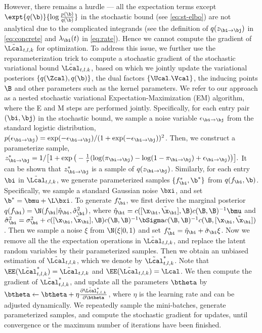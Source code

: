  However, there remains a hurdle ---  all the expectation terms except $\expt{q(\b)}{\log\frac{p(\b)}{q(\b)}}$ in the stochastic bound (see \eqref{eq:st-elbo}) are not analytical due to the complicated integrands (see the definition of $q(z_{\bi \rightarrow \bj})$ in \eqref{eq:concrete} and $\lambda_\bi(t)$ in \eqref{eq:rate}).  Hence we cannot  compute the gradient of $\tilde{\Lcal}_{t,l,k}$ for optimization. To address this issue, we further use the reparameterization trick to compute a stochastic gradient of the stochastic variational bound  $\tilde{\Lcal}_{t,l.k}$, based on which we jointly update the variational posteriors $\{q(\Zcal), q(\b)\}$, the dual factors $\{\Ucal. \Vcal\}$, the inducing points $\B$ and other parameters such as the kernel parameters. We refer to our approach as a nested stochastic variational Expectation-Maximization (EM) algorithm, where the E and M steps are performed jointly. Specifically, for each entry pair $(\bi, \bj)$ in the stochastic bound, we sample a noise variable $\epsilon_{\bi\rightarrow \bj}$ from the standard logistic distribution, $p(\epsilon_{\bi\rightarrow \bj} ) = {\exp(-\epsilon_{\bi\rightarrow \bj})}/{(1 + \exp(-\epsilon_{\bi\rightarrow \bj}))^2}$. Then, we construct a parameterize sample, $z^*_{\bi\rightarrow \bj} = {1}/\big[{1 + \exp\big(-\frac{1}{\tau}(\log(\pi_{\bi \rightarrow \bj}) - \log(1 - \pi_{\bi \rightarrow \bj}) + \epsilon_{\bi\rightarrow \bj})\big)}\big].$
 It can be shown that $z^*_{\bi \rightarrow \bj}$ is a sample of $q(z_{\bi \rightarrow \bj})$. Similarly, for each entry $\bi$ in $\tilde{\Lcal}_{t,l,k}$, we generate parameterized samples $\{f_\bi^*, \b^*\}$ from $q(f_\bi, \b)$. Specifically, we sample a standard Gaussian noise $\bxi$, and set $\b^* = \bmu + \L \bxi$. To generate $f_\bi^*$, we first derive the marginal posterior $q(f_\bi) = \N(f_\bi|\hat{\eta}_\bi, \hat{\sigma}_\bi^2)$, where $\hat{\eta}_\bi = c([\x_\bi, \tilde{\x}_\bi], \B)c(\B,\B)^{-1}\bmu$ and $\hat{\sigma}_\bi^2 = \sigma_\bi^2 + c([\x_\bi, \tilde{\x}_\bi], \B)c(\B,\B)^{-1}\bSigma c(\B,\B)^{-1} c(\B, [\x_\bi, \tilde{\x}_\bi])$. Then we sample a noise $\xi$ from $\N(\xi|0, 1)$ and set $f_\bi^*= \hat{\eta}_\bi + \hat{\sigma}_\bi \xi$. Now we remove all the the expectation operations in $\tilde{\Lcal}_{t,l,k}$, and replace the latent random variables by their parameterized samples. Then we obtain an unbiased estimation of $\tilde{\Lcal}_{t,l,k}$, which we denote  by $\tilde{\Lcal}_{t,l,k}^*$. Note that $\EE(\tilde{\Lcal}_{t,l,k}^*) = \tilde{\Lcal}_{t,l,k}$ and $\EE(\tilde{\Lcal}_{t,l,k}) = \Lcal$. 
 We then compute the gradient of $\tilde{\Lcal}_{t,l,k}^*$, and update all the parameters $\btheta$ by $\btheta \leftarrow \btheta + \eta \frac{\partial \tilde{\Lcal}_{t,l,k}^*}{\partial \btheta}$, where $\eta$ is the learning rate and can be adjusted dynamically. We repeatedly sample the mini-batches, generate parameterized samples, and compute the stochastic gradient for updates, until convergence or the maximum number of iterations have been finished. 
 
